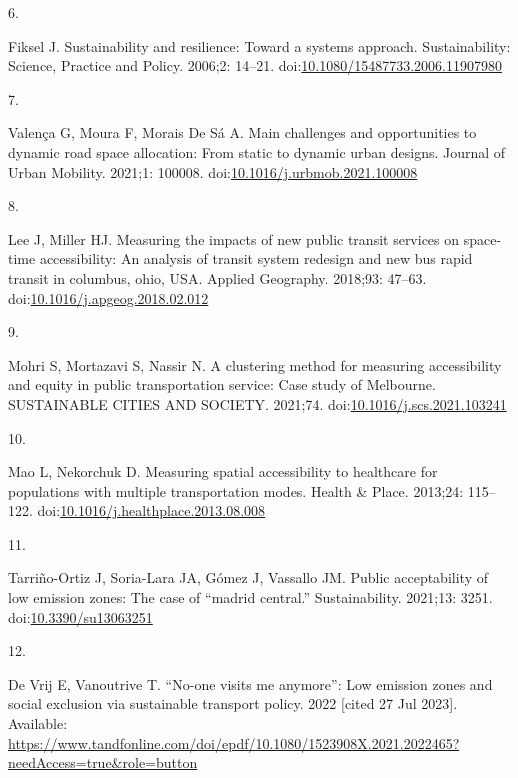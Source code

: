 \documentclass[10pt,letterpaper]{article}
\newlength{\cslhangindent}
\newlength{\csllabelwidth}
\newlength{\cslentryspacingunit} %
\newenvironment{CSLReferences}[2] %
 {%
  \setlength{\parindent}{0pt}
  \ifodd #1
  \let\oldpar\par
  \def\par{\hangindent=\cslhangindent\oldpar}
  \fi
  \setlength{\parskip}{#2\cslentryspacingunit}
 }%
 {}
\newcommand{\CSLLeftMargin}[1]{\parbox[t]{\csllabelwidth}{#1}}
\newcommand{\CSLRightInline}[1]{\parbox[t]{\linewidth - \csllabelwidth}{#1}\break}
\begin{document}
\begin{CSLReferences}{0}{0}
\leavevmode{}%
\CSLLeftMargin{6. }%
\CSLRightInline{Fiksel J. Sustainability and resilience: Toward a
systems approach. Sustainability: Science, Practice and Policy. 2006;2:
14--21.
doi:\href{https://doi.org/10.1080/15487733.2006.11907980}{10.1080/15487733.2006.11907980}}

\leavevmode{}%
\CSLLeftMargin{7. }%
\CSLRightInline{Valença G, Moura F, Morais De Sá A. Main challenges and
opportunities to dynamic road space allocation: From static to dynamic
urban designs. Journal of Urban Mobility. 2021;1: 100008.
doi:\href{https://doi.org/10.1016/j.urbmob.2021.100008}{10.1016/j.urbmob.2021.100008}}

\leavevmode{}%
\CSLLeftMargin{8. }%
\CSLRightInline{Lee J, Miller HJ. Measuring the impacts of new public
transit services on space-time accessibility: An analysis of transit
system redesign and new bus rapid transit in columbus, ohio, {USA}.
Applied Geography. 2018;93: 47--63.
doi:\href{https://doi.org/10.1016/j.apgeog.2018.02.012}{10.1016/j.apgeog.2018.02.012}}

\leavevmode{}%
\CSLLeftMargin{9. }%
\CSLRightInline{Mohri S, Mortazavi S, Nassir N. A clustering method for
measuring accessibility and equity in public transportation service:
{Case} study of {Melbourne}. SUSTAINABLE CITIES AND SOCIETY. 2021;74.
doi:\href{https://doi.org/10.1016/j.scs.2021.103241}{10.1016/j.scs.2021.103241}}

\leavevmode{}%
\CSLLeftMargin{10. }%
\CSLRightInline{Mao L, Nekorchuk D. Measuring spatial accessibility to
healthcare for populations with multiple transportation modes. Health \&
Place. 2013;24: 115--122.
doi:\href{https://doi.org/10.1016/j.healthplace.2013.08.008}{10.1016/j.healthplace.2013.08.008}}

\leavevmode{}%
\CSLLeftMargin{11. }%
\CSLRightInline{Tarriño-Ortiz J, Soria-Lara JA, Gómez J, Vassallo JM.
Public acceptability of low emission zones: The case of {``madrid
central.''} Sustainability. 2021;13: 3251.
doi:\href{https://doi.org/10.3390/su13063251}{10.3390/su13063251}}

\leavevmode{}%
\CSLLeftMargin{12. }%
\CSLRightInline{De Vrij E, Vanoutrive T. {``No-one visits me anymore''}:
Low emission zones and social exclusion via sustainable transport
policy. 2022 {[}cited 27 Jul 2023{]}. Available:
\url{https://www.tandfonline.com/doi/epdf/10.1080/1523908X.2021.2022465?needAccess=true\&role=button}}


\end{CSLReferences}
\end{document}
